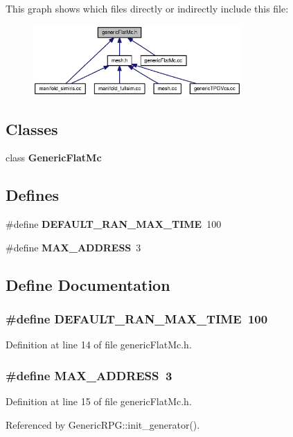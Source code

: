 This graph shows which files directly or indirectly include this file:\nopagebreak
\begin{figure}[H]
\begin{center}
\leavevmode
\includegraphics[width=225pt]{genericFlatMc_8h__dep__incl}
\end{center}
\end{figure}
\subsection*{Classes}
\begin{CompactItemize}
\item 
class {\bf GenericFlatMc}
\end{CompactItemize}
\subsection*{Defines}
\begin{CompactItemize}
\item 
\#define {\bf DEFAULT\_\-RAN\_\-MAX\_\-TIME}~100
\item 
\#define {\bf MAX\_\-ADDRESS}~3
\end{CompactItemize}


\subsection{Define Documentation}
\subsubsection[{DEFAULT\_\-RAN\_\-MAX\_\-TIME}]{\setlength{\rightskip}{0pt plus 5cm}\#define DEFAULT\_\-RAN\_\-MAX\_\-TIME~100}\label{genericFlatMc_8h_95a6218d50e244f6e58b6cca098c1d65}




Definition at line 14 of file genericFlatMc.h.
\subsubsection[{MAX\_\-ADDRESS}]{\setlength{\rightskip}{0pt plus 5cm}\#define MAX\_\-ADDRESS~3}\label{genericFlatMc_8h_aba07841c3e227bc8bdd8ccdad149349}




Definition at line 15 of file genericFlatMc.h.

Referenced by GenericRPG::init\_\-generator().